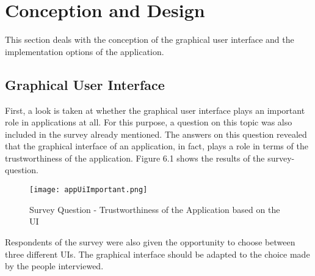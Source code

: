 

\chapter{Conception and Design}
This section deals with the conception of the graphical user interface and the implementation options of the application.
\section{Graphical User Interface}
First, a look is taken at whether the graphical user interface plays an important role in applications at all. For this purpose, a question on this topic was also included in the survey already mentioned. The answers on this question revealed that the graphical interface of an application, in fact, plays a role in terms of the trustworthiness of the application. Figure 6.1 shows the results of the survey-question.
\begin{figure}[H]
	\centering
	\texttt{[image: appUiImportant.png]}
	\caption[Survey Question]{Survey Question - Trustworthiness of the Application based on the UI}
\end{figure}
\noindent
Respondents of the survey were also given the opportunity to choose between three different UIs. The graphical interface should be adapted to the choice made by the people interviewed.
